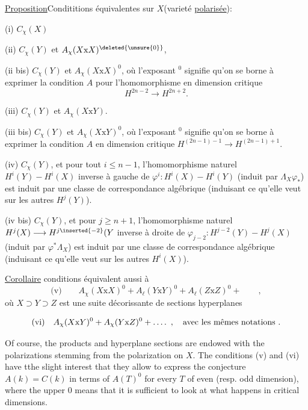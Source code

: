\uline{Proposition}\quad Condititions équivalentes sur $X$(varieté \uline{polarisée}):

(i) $C_{\chi}(X)$

(ii) $C_{\chi}(Y)$ et $A_{\chi}(X\mathrm{x}X)^{\deleted{\unsure{0}}}$, 

(ii bis) $C_{\chi}(Y)$ et $A_{\chi}(X\mathrm{x}X)^0$, où l'exposant $^0$ signifie qu'on se borne à exprimer la condition $A$ pour l'homomorphisme en dimension critique
\[
H^{2n-2}\longrightarrow H^{2n+2}.
\]

(iii) $C_{\chi}(Y)$ et $A_{\chi}(X\mathrm{x}Y)$.

(iii bis) $C_{\chi}(Y)$ et $A_{\chi}(X\mathrm{x}Y)^0$, où l'exposant $^0$ signifie qu'on se borne à exprimer la condition $A$ en dimension critique $H^{(2n-1)-1}\longrightarrow H^{(2n-1)+1}$.

(iv)  $C_{\chi}(Y)$, et pour tout $i\leq n-1$, l'homomorphisme naturel $H^i(Y)\mathbin{-}H^i(X)$ inverse à gauche de $\varphi^i:H^i(X)\mathbin{-}H^i(Y)$ (induit par $\Lambda_X\varphi_{*}$) est induit par une classe de correspondance algébrique (induisant ce qu'elle veut sur les autres $H^j(Y)$).

(iv bis) $C_{\chi}(Y)$, et pour $j\geq n+1$, l'homomorphisme naturel $H^j(X)\longrightarrow H^{j\inserted{-2}}(Y$ inverse à droite de $\varphi_{j-2}:H^{j-2}(Y)\mathbin{-}H^j(X)$  (induit par $\varphi^*\Lambda_X$) est induit par une classe de correspondance algébrique (induisant ce qu'elle veut sur les autres $H^i(X)$).

\uline{Corollaire}\quad {} conditions équivalent aussi à
\[
\text{(v)}\qquad A_{\chi}(X\mathrm{x}X)^0+A_{\ell}(Y\mathrm{x}Y)^0+A_{\ell}(Z\mathrm{x}Z)^0+\qquad,
\]
où $X\supset Y\supset Z$ est une suite décorissante de sections hyperplanes


\[
\text{(vi)}\quad A_{\chi}(X\mathrm{x}Y)^0+A_{\chi}(Y\mathrm{x}Z)^0+\mathinner{\ldotp\ldotp\ldotp\ldotp}\ ,\quad\text{avec les mêmes notations .}
\]

Of course, the products and hyperplane sections are endowed with the polarizations stemming from the polarization on $X$. The conditions (v) and (vi) have tthe slight interest that they allow to express the conjecture $A(k)=C(k)$ in terms of $A(T)^0$ for every $T$ of even (resp. odd dimension), where the upper $0$ means that it is sufficient to look at what happens in critical dimensions.

